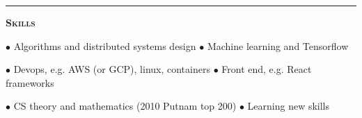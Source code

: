 \documentclass[11 pt]{article}
\begin{document}
\begin{itemize}

\end{itemize}

\vspace{6pt}

\hrule

\begin{center}\begin{Large}\textsc{\textbf{Skills}\\}\end{Large}\end{center}


$\bullet$ Algorithms and distributed systems design \hfill
$\bullet$ Machine learning and Tensorflow

$\bullet$ Devops, e.g. AWS (or GCP), linux, containers \hfill
$\bullet$ Front end, e.g. React frameworks

$\bullet$ CS theory and mathematics (2010 Putnam top 200) \hfill
$\bullet$ Learning new skills



\end{document}
